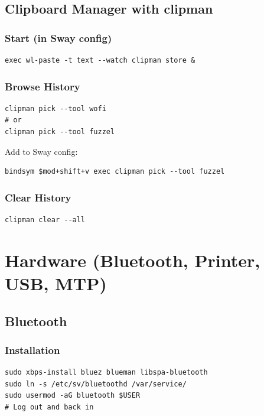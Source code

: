 \documentclass[12pt, a4paper]{book}
\begin{document}
\section{Clipboard Manager with clipman}

\subsection{Start (in Sway config)}
\begin{lstlisting}
exec wl-paste -t text --watch clipman store &
\end{lstlisting}

\subsection{Browse History}
\begin{lstlisting}
clipman pick --tool wofi
# or
clipman pick --tool fuzzel
\end{lstlisting}

Add to Sway config:
\begin{lstlisting}
bindsym $mod+shift+v exec clipman pick --tool fuzzel
\end{lstlisting}

\subsection{Clear History}
\begin{lstlisting}
clipman clear --all
\end{lstlisting}

\chapter{Hardware (Bluetooth, Printer, USB, MTP)}

\section{Bluetooth}

\subsection{Installation}
\begin{lstlisting}
sudo xbps-install bluez blueman libspa-bluetooth
sudo ln -s /etc/sv/bluetoothd /var/service/
sudo usermod -aG bluetooth $USER
# Log out and back in
\end{lstlisting}
\end{document}
